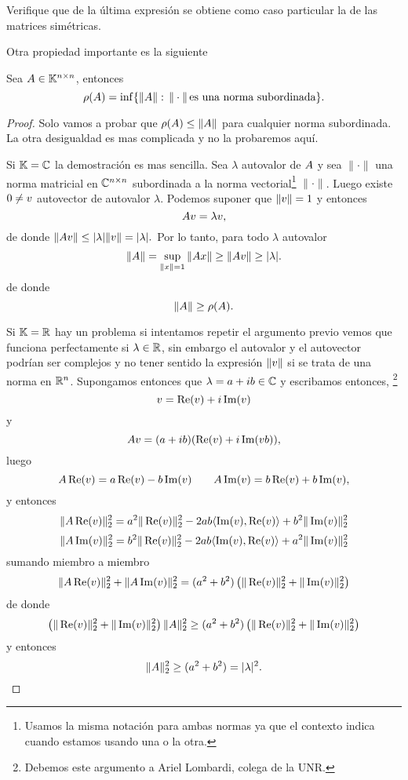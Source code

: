\etcc
\begin{ej}
 Verifique que de la última expresión se obtiene como caso particular la de las matrices simétricas.
\end{ej}
Otra propiedad importante es la siguiente
\begin{prop}
 \label{prop:infmat=rho}
Sea $\Ab\in\Knn$, entonces
$$
\rho(\Ab)=\inf
\{\|\Ab\|:\, \|\cdot \|\,  \mbox{es una norma subordinada}\}.$$
\end{prop}
\begin{proof}
Solo vamos a probar que  $\rho(\Ab)\le \|\Ab\|$ para cualquier norma subordinada. La otra desigualdad es mas complicada y no la probaremos aquí.

 Si $\mathbb K=\mathbb C$ la demostración es mas sencilla.
 Sea $\lambda$ autovalor de $\Ab$ y sea $\|\cdot\|$ una norma matricial en $\mathbb C^{n\times n}$ subordinada a la norma vectorial\footnote{Usamos la misma notación para ambas normas ya que el contexto indica cuando estamos usando una o la otra.} $\|\cdot\|$. Luego existe $\cero\neq\vb$ autovector de autovalor $\lambda$. Podemos suponer que $\|\vb\|=1$ y entonces
 $$
 \Ab\vb=\lambda\vb,
 $$
 de donde
 $\|\Ab\vb\|\le |\lambda|\|\vb\|=|\lambda|.$ Por lo tanto, para todo $\lambda$ autovalor
 $$
 \|\Ab\|=\sup_{\|\xb\|=1}\|\Ab\xb\|\ge \|\Ab\vb\|\ge |\lambda|.
 $$
 de donde
 $$
 \|\Ab\|\ge \rho(\Ab).
 $$
 
 Si $\mathbb K=\mathbb R$ hay un problema si intentamos repetir el argumento previo vemos que funciona perfectamente si $\lambda \in \mathbb R$, sin embargo el autovalor y el autovector podrían ser complejos y no tener sentido la expresión $\|\vb\|$ si se trata de una norma en $\mathbb R^{n}$.
 Supongamos entonces que $\lambda=a+ib\in \mathbb C$ y escribamos entonces, \footnote{Debemos este argumento a Ariel Lombardi, colega de la UNR.}
$$
\vb=\Re(\vb)+i\Im(\vb)
$$
y
 $$
 \Ab\vb=(a+ib)(\Re(\vb)+i\Im(vb)),
 $$
 luego
 $$
 \Ab \Re(\vb)=a\Re(\vb)-b\Im(\vb) \qquad
 \Ab \Im(\vb)=b\Re(\vb)+b\Im(\vb),
 $$
 y entonces
 $$
 \|\Ab \Re(\vb)\|_2^2=a^2\|\Re(\vb)\|_2^2-2ab\langle \Im(\vb),\Re(\vb)\rangle+b^2\|\Im(\vb)\|_2^2
 $$
 $$
 \|\Ab \Im(\vb)\|_2^2=b^2\|\Re(\vb)\|_2^2-2ab\langle \Im(\vb),\Re(\vb)\rangle+a^2\|\Im(\vb)\|_2^2
 $$
 sumando miembro a miembro
 $$\|\Ab \Re(\vb)\|_2^2+\|\Ab \Im(\vb)\|_2^2=(a^2+b^2)\left(\|\Re(\vb)\|_2^2+\|\Im(\vb)\|_2^2\right)
 $$
 de donde
 $$
 \left(\|\Re(\vb)\|_2^2+\|\Im(\vb)\|_2^2\right)\|\Ab\|_2^2\ge (a^2+b^2)\left(\|\Re(\vb)\|_2^2+\|\Im(\vb)\|_2^2\right)
 $$
 y entonces
 $$
 \|\Ab\|_2^2\ge (a^2+b^2)=|\lambda|^2.
 $$
 

\end{proof}
